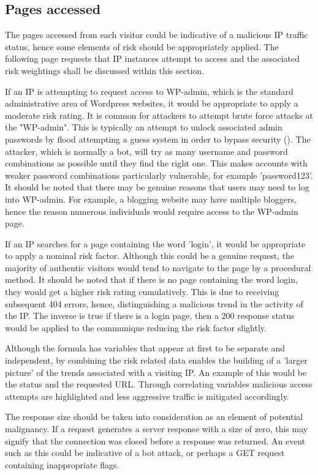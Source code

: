 \subsection{Pages accessed}

The pages accessed from each visitor could be indicative of a malicious IP traffic status, hence some elements of risk should be appropriately applied. The following page requests that IP instances attempt to access and the associated risk weightings shall be discussed within this section.

If an IP is attempting to request access to WP-admin, which is the standard administrative area of Wordpress websites, it would be appropriate to apply a moderate risk rating. It is common for attackers to attempt brute force attacks at the "WP-admin". This is typically an attempt to unlock associated admin passwords by flood attempting a guess system in order to bypass security (\cite{Brute}). The attacker, which is normally a bot, will try as many username and password combinations as possible until they find the right one. This makes accounts with weaker password combinations particularly vulnerable, for example 'password123'. It should be noted that there may be genuine reasons that users may need to log into WP-admin. For example, a blogging website may have multiple bloggers, hence the reason numerous individuals would require access to the WP-admin page.

If an IP searches for a page containing the word 'login', it would be appropriate to apply a nominal risk factor. Although this could be a genuine request, the majority of authentic visitors would tend to navigate to the page by a procedural method. It should be noted that if there is no page containing the word login, they would get a higher risk rating cumulatively. This is due to receiving subsequent 404 errors, hence, distinguishing a malicious trend in the activity of the IP. The inverse is true if there is a login page, then a 200 response status would be applied to the communique reducing the risk factor slightly.

Although the formula has variables that appear at first to be separate and independent, by combining the risk related data enables the building of a 'larger picture' of the trends associated with a visiting IP.  An example of this would be the status and the requested URL. Through correlating variables malicious access attempts are highlighted and less aggressive traffic is mitigated accordingly.

The response size should be taken into consideration as an element of potential malignancy. If a request generates a server response with a size of zero, this may signify that the connection was closed before a response was returned. An event such as this could be indicative of a bot attack, or perhaps a GET request containing inappropriate flags.

